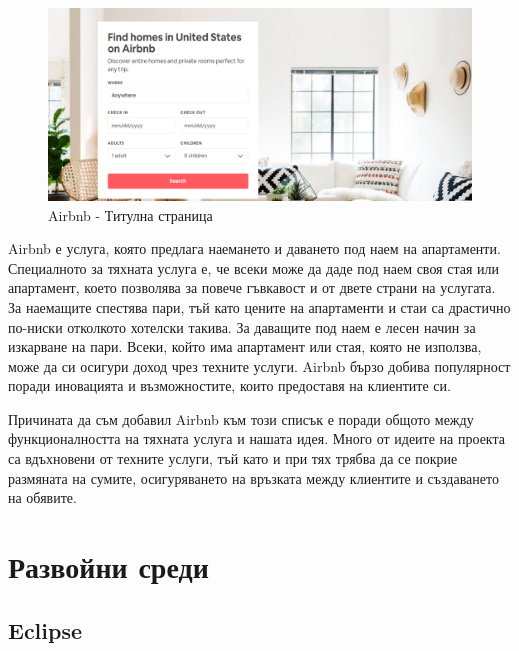 \begin{figure}[h]
    \centering
   \includegraphics[scale=.3]{images/airbnb.png}
    \caption{Airbnb - Титулна страница}
    \label{fig:airbnb}
\end{figure}

Airbnb е услуга, която предлага наемането и даването под наем на апартаменти. Специалното за тяхната услуга е, че всеки може да даде под наем своя стая или апартамент, което позволява за повече гъвкавост и от двете страни на услугата. За наемащите спестява пари, тъй като цените на апартаменти и стаи са драстично по-ниски отколкото хотелски такива. За даващите под наем е лесен начин за изкарване на пари. Всеки, който има апартамент или стая, която не използва, може да си осигури доход чрез техните услуги. Airbnb бързо добива популярност поради иновацията и възможностите, които предоставя на клиентите си.

Причината да съм добавил Airbnb към този списък е поради общото между функционалността на тяхната услуга и нашата идея. Много от идеите на проекта са вдъхновени от техните услуги, тъй като и при тях трябва да се покрие размяната на сумите, осигуряването на връзката между клиентите и създаването на обявите.

\section{Развойни среди}
    \subsection{Eclipse}
    
